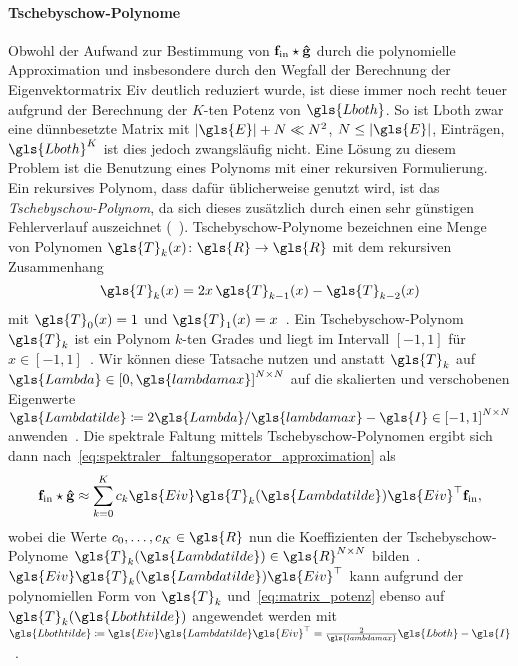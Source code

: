 \paragraph{Tschebyschow-Polynome}
\label{tschebyschow_polynome}

Obwohl der Aufwand zur Bestimmung von $\mathbf{f}_{\mathrm{in}} \star \mathbf{\hat g}$ durch die polynomielle Approximation und insbesondere durch den Wegfall der Berechnung der Eigenvektormatrix \gls{Eiv} deutlich reduziert wurde, ist diese immer noch recht teuer aufgrund der Berechnung der $K$-ten Potenz von $\gls{Lboth}$.
So ist \gls{Lboth} zwar eine dünnbesetzte Matrix mit $\left|\gls{E}\right| + N \ll N^2$, $N \leq \left|\gls{E}\right|$, Einträgen, $\gls{Lboth}^K$ ist dies jedoch zwangsläufig nicht.
Eine Lösung zu diesem Problem ist die Benutzung eines Polynoms mit einer rekursiven Formulierung.
Ein rekursives Polynom, dass dafür üblicherweise genutzt wird, ist das \emph{Tschebyschow-Polynom}, da sich dieses zusätzlich durch einen sehr günstigen Fehlerverlauf auszeichnet (\vgl{}~\cite{Hammond}).
Tschebyschow-Polynome bezeichnen eine Menge von Polynomen $\gls{T}_k\left(x\right) \colon \gls{R} \to \gls{R}$ mit dem rekursiven Zusammenhang
\begin{equation*}
  \gls{T}_k\left(x\right) = 2x\, \gls{T}_{k-1}\left(x\right) - \gls{T}_{k-2}\left(x\right)
\end{equation*}
mit $\gls{T}_0\left(x\right) = 1$ und $\gls{T}_1\left(x\right) = x$~\cite{Hammond}.
Ein Tschebyschow-Polynom $\gls{T}_k$ ist ein Polynom $k$-ten Grades und liegt im Intervall $\left[-1, 1\right]$ für $x \in \left[-1, 1\right]$~\cite{Hammond}.
Wir können diese Tatsache nutzen und anstatt $\gls{T}_k$ auf $\gls{Lambda} \in {\left[0, \gls{lambdamax}\right]}^{N \times N}$ auf die skalierten und verschobenen Eigenwerte $\gls{Lambdatilde} \coloneqq 2\gls{Lambda}/\gls{lambdamax} - \gls{I} \in {\left[-1, 1\right]}^{N \times N}$ anwenden~\cite{Defferrard}.
Die spektrale Faltung mittels Tschebyschow-Polynomen ergibt sich dann nach~\eqref{eq:spektraler_faltungsoperator_approximation} als
\begin{equation}
  \ve{f}_{\mathrm{in}} \star \ve{\hat g} \approx \sum_{k=0}^K c_k\gls{Eiv}\gls{T}_k\left(\gls{Lambdatilde}\right)\gls{Eiv}^{\top}\ve{f}_{\mathrm{in}},
  \label{eq:tschebyschow_faltung}
\end{equation}
wobei die Werte $c_0, \ldots, c_K \in \gls{R}$ nun die Koeffizienten der Tschebyschow-Polynome $\gls{T}_k\left(\gls{Lambdatilde}\right) \in \gls{R}^{N \times N}$ bilden~\cite{Defferrard}.
$\gls{Eiv}\gls{T}_k\left(\gls{Lambdatilde}\right)\gls{Eiv}^{\top}$ kann aufgrund der polynomiellen Form von $\gls{T}_k$ und~\eqref{eq:matrix_potenz} ebenso auf $\gls{T}_k\left(\gls{Lbothtilde}\right)$ angewendet werden mit $\gls{Lbothtilde} \coloneqq \gls{Eiv}\gls{Lambdatilde}\gls{Eiv}^{\top} = \frac{2}{\gls{lambdamax}}\gls{Lboth} - \gls{I}$~\cite{Defferrard}.
